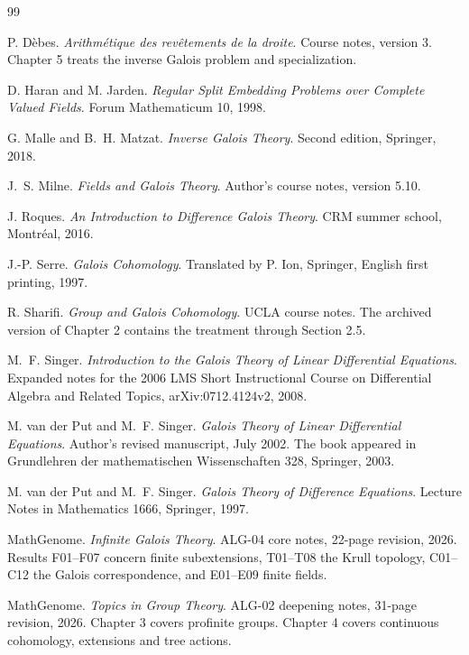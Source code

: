 \documentclass[11pt,oneside,openany]{book}
\newcommand{\runningchapter}{}
\theoremstyle{definition}
\theoremstyle{remark}
\begin{document}
\begin{thebibliography}{99}
{}
\renewcommand{\runningchapter}{Bibliography}
\setlength{\itemsep}{4pt}

P. D\`ebes.
\emph{Arithm\'etique des rev\^etements de la droite}.
Course notes, version 3. Chapter 5 treats the inverse Galois problem
and specialization.

D. Haran and M. Jarden.
\emph{Regular Split Embedding Problems over Complete Valued Fields}.
Forum Mathematicum 10, 1998.

G. Malle and B.~H. Matzat.
\emph{Inverse Galois Theory}.
Second edition, Springer, 2018.

J.~S. Milne.
\emph{Fields and Galois Theory}.
Author's course notes, version 5.10.

J. Roques.
\emph{An Introduction to Difference Galois Theory}.
CRM summer school, Montr\'eal, 2016.

J.-P. Serre.
\emph{Galois Cohomology}.
Translated by P. Ion, Springer, English first printing, 1997.

R. Sharifi.
\emph{Group and Galois Cohomology}.
UCLA course notes. The archived version of Chapter 2 contains the
treatment through Section 2.5.

M.~F. Singer.
\emph{Introduction to the Galois Theory of Linear Differential Equations}.
Expanded notes for the 2006 LMS Short Instructional Course on
Differential Algebra and Related Topics, arXiv:0712.4124v2, 2008.

M. van der Put and M.~F. Singer.
\emph{Galois Theory of Linear Differential Equations}.
Author's revised manuscript, July 2002. The book appeared in
Grundlehren der mathematischen Wissenschaften 328, Springer, 2003.

M. van der Put and M.~F. Singer.
\emph{Galois Theory of Difference Equations}.
Lecture Notes in Mathematics 1666, Springer, 1997.

MathGenome.
\emph{Infinite Galois Theory}.
ALG-04 core notes, 22-page revision, 2026.
Results F01--F07 concern finite subextensions, T01--T08 the Krull
topology, C01--C12 the Galois correspondence, and E01--E09 finite fields.

MathGenome.
\emph{Topics in Group Theory}.
ALG-02 deepening notes, 31-page revision, 2026.
Chapter 3 covers profinite groups. Chapter 4 covers continuous
cohomology, extensions and tree actions.


\end{thebibliography}
\end{document}
